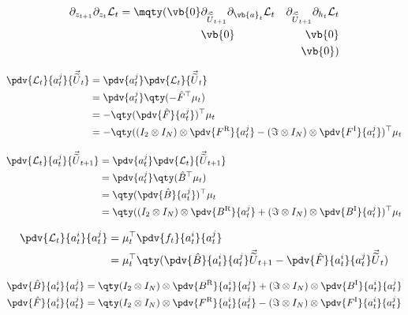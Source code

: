 \documentclass{article}
\newcommand{\isovecU}{\vec{\widetilde{U}}}
\newcommand{\BR}{B^{\text{R}}}
\newcommand{\BI}{B^{\text{I}}}
\newcommand{\FR}{F^{\text{R}}}
\newcommand{\FI}{F^{\text{I}}}
\begin{document}
\begin{align*}
  \partial_{z_{t+1}} \partial_{z_t}\mathcal{L}_t = \mqty(
    \vb{0} & \partial_{\isovecU_{t+1}} \partial_{\vb{a}_t} \mathcal{L}_t & \partial_{\isovecU_{t+1}} \partial_{h_t} \mathcal{L}_t \\
    & \vb{0} & \vb{0} \\
    & & \vb{0} 
  )
\end{align*}




\begin{align*}
  \pdv{\mathcal{L}_t}{a^j_t}{\isovecU_t} &= \pdv{a^j_t} \pdv{\mathcal{L}_t}{\isovecU_t} \\
  &= \pdv{a^j_t} \qty(-\hat F^\top \mu_t) \\
  &= -\qty(\pdv{\hat F}{a^j_t})^\top \mu_t \\
  &= -\qty((I_2 \otimes I_N) \otimes \pdv{\FR}{a^j_t} - (\Im \otimes I_N) \otimes \pdv{\FI}{a^j_t})^\top \mu_t \\
\end{align*}

\begin{align*}
  \pdv{\mathcal{L}_t}{a^j_t}{\isovecU_{t+1}} &= \pdv{a^j_t} \pdv{\mathcal{L}_t}{\isovecU_{t+1}} \\
  &= \pdv{a^j_t} \qty(\hat B^\top \mu_t) \\
  &= \qty(\pdv{\hat B}{a^j_t})^\top \mu_t \\
  &= \qty((I_2 \otimes I_N) \otimes \pdv{\BR}{a^j_t} + (\Im \otimes I_N) \otimes \pdv{\BI}{a^j_t})^\top \mu_t \\
\end{align*}

\begin{align*}
  \pdv{\mathcal{L}_t}{a^i_t}{a^j_t} &= \mu_t^\top \pdv{f_t}{a^i_t}{a^j_t} \\
  &= \mu_t^\top \qty(\pdv{\hat B}{a^i_t}{a^j_t} \isovecU_{t+1} - \pdv{\hat F}{a^i_t}{a^j_t} \isovecU_t) \\
\end{align*}

\begin{align*}
  \pdv{\hat B}{a^i_t}{a^j_t} &= \qty(I_2 \otimes I_N) \otimes \pdv{\BR}{a^i_t}{a^j_t} + (\Im \otimes I_N) \otimes \pdv{\BI}{a^i_t}{a^j_t} \\
  \pdv{\hat F}{a^i_t}{a^j_t} &= \qty(I_2 \otimes I_N) \otimes \pdv{\FR}{a^i_t}{a^j_t} - (\Im \otimes I_N) \otimes \pdv{\FI}{a^i_t}{a^j_t} \\
\end{align*}
\end{document}
